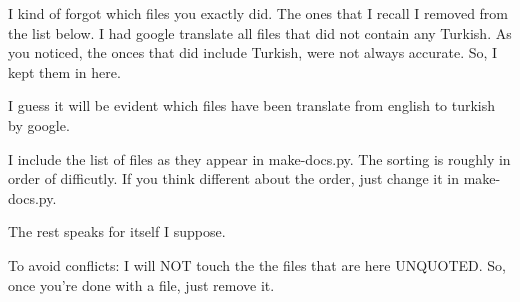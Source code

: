\documentclass[12pt]{article}
\newcommand{\nvf}[1]{{\leavevmode\color{red}#1}\marginnote{\dbend}}
\begin{document}
\nvf{I kind of forgot which files you exactly did. The ones that I recall I removed from the list below. I had google translate all files that did not contain any Turkish. As you noticed, the onces that did include Turkish, were not always accurate. So, I kept them in here. 

I guess it will be evident which files have been translate from english to turkish by google. 

I include the list of files as they appear in make-docs.py. The sorting is roughly in order of difficutly. If you think different about the order, just change it in make-docs.py.

The rest speaks for itself I suppose.

To avoid conflicts: I will NOT touch the the files that are here UNQUOTED. So, once you're done with a file, just remove it. 
}


\begin{longtable}{HLL}\toprule %

%
%
%
%
%
%
%
%
%
%
%
%
%
%
%
%
%
%
%
%
%
%
%
%
%
%
%
%
%
%
%
%
%
%
%
%
%
%
%
%
%
%
\bottomrule 
\end{longtable}
\clearpage
\end{document}
